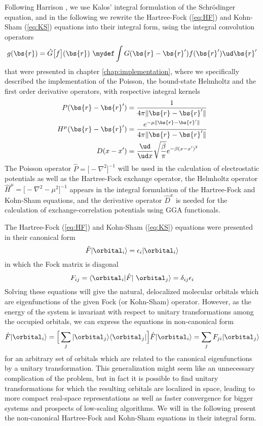 Following Harrison \etal\cite{Harrison:2004}, we use Kalos'\cite{Kalos} integral formulation of the 
Schr\"{o}dinger equation, and in the following we rewrite the Hartree-Fock (\ref{eq:HF}) and 
Kohn-Sham (\ref{eq:KS}) equations into their integral form, using the integral convolution operators
\begin{equation}
    g(\bs{r}) = \hat{G}\big[f\big](\bs{r}) \mydef \int G(\bs{r}-\bs{r}') f(\bs{r}') \ud\bs{r}'
\end{equation}
that were presented in chapter \ref{chap:implementation}, where we specifically described
the implementation of the Poisson, the bound-state Helmholtz and the first order derivative 
operators, with respective integral kernels
\begin{align}
    P(\bs{r}-\bs{r}') &= \frac{1}{4\pi\|\bs{r}-\bs{r}'\|}\\
    H^\mu(\bs{r}-\bs{r}') &= \frac{e^{-\mu\|\bs{r}-\bs{r}'\|}}{4\pi\|\bs{r}-\bs{r}'\|}\\
    D(x-x') &= \frac{\ud}{\ud x} \sqrt{\frac{\beta}{\pi}}e^{-\beta (x-x')^2} 
\end{align}
The Poisson operator $\hat{P}=\big[-\nabla^2\big]^{-1}$ will be used in the calculation of 
electrostatic potentials as well as the Hartree-Fock exchange operator, the Helmholtz 
operator $\hat{H}^\mu=\big[-\nabla^2-\mu^2\big]^{-1}$ appears in
the integral formulation of the Hartree-Fock and Kohn-Sham equations, and the derivative
operator $\hat{D}^x$ is needed for the calculation of exchange-correlation potentials using
GGA functionals.

The Hartree-Fock (\ref{eq:HF}) and Kohn-Sham (\ref{eq:KS}) equations were presented in their
canonical form
\begin{equation}
    \hat{F}|\orbital_i\rangle = \epsilon_i |\orbital_i\rangle
\end{equation}
in which the Fock matrix is diagonal
\begin{equation}
    F_{ij} = \langle \orbital_i | \hat{F} | \orbital_j \rangle = \delta_{ij}\epsilon_i
\end{equation}
Solving these equations will give the natural, delocalized molecular orbitals
which are eigenfunctions of the given Fock (or Kohn-Sham) operator. However, as the energy of
the system is invariant with respect to unitary transformations among the occupied orbitals,
we can express the equations in non-canonical form
\begin{equation}
    \hat{F}| \orbital_i \rangle	
	= \Big[\sum_j |\orbital_j \rangle\langle \orbital_j|\Big] \hat{F}|\orbital_i \rangle 
	= \sum_j F_{ji} |\orbital_j \rangle
\end{equation}
for an arbitrary set of orbitals which are related to the canonical eigenfunctions by a
unitary transformation. This generalization might seem like an unnecessary complication of
the problem, but in fact it is possible to find unitary transformations for which the resulting 
orbitals are localized in space, leading to more compact real-space representations as well
as faster convergence for bigger systems and prospects of low-scaling algorithms. We will in
the following present the non-canonical Hartree-Fock and Kohn-Sham equations in their integral 
form. 

